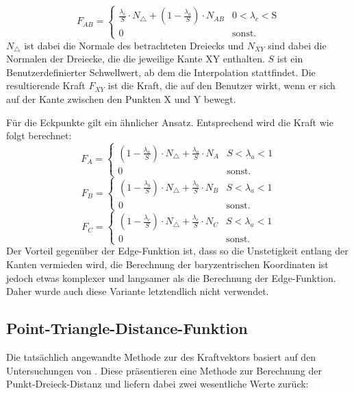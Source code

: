 \documentclass[conference]{IEEEtran}
\begin{document}
\begin{equation*}
    F_{AB} = 
    \begin{cases} 
        \frac{\lambda_c}{S}\cdot N_{\triangle} + (1-\frac{\lambda_a}{S})\cdot N_{AB} &  0 < \lambda_c < \text{S} \\
        0 & \text{sonst.}
    \end{cases}
\end{equation*}
$N_{\triangle}$ ist dabei die Normale des betrachteten Dreiecks und $N_{XY}$ sind dabei die Normalen der Dreiecke, die die jeweilige Kante XY enthalten. $S$ ist ein Benutzerdefinierter Schwellwert, ab dem die Interpolation stattfindet.
Die resultierende Kraft $F_{XY}$ ist die Kraft, die auf den Benutzer wirkt, wenn er sich auf der Kante zwischen den Punkten X und Y bewegt.

Für die Eckpunkte gilt ein ähnlicher Ansatz. Entsprechend wird die Kraft wie folgt berechnet:
\begin{equation*}
    F_{A} = 
    \begin{cases} 
        (1-\frac{\lambda_a}{S})\cdot N_{\triangle} + \frac{\lambda_a}{S}\cdot N_{A} &  S < \lambda_a < 1 \\
        0 & \text{sonst.}
    \end{cases}
\end{equation*} 
\begin{equation*}
    F_{B} = 
    \begin{cases} 
        (1-\frac{\lambda_b}{S})\cdot N_{\triangle} + \frac{\lambda_b}{S}\cdot N_{B} &  S < \lambda_a < 1 \\
        0 & \text{sonst.}
    \end{cases}
\end{equation*} 
\begin{equation*}
    F_{C} = 
    \begin{cases} 
        (1-\frac{\lambda_c}{S})\cdot N_{\triangle} + \frac{\lambda_c}{S}\cdot N_{C} &  S < \lambda_a < 1 \\
        0 & \text{sonst.}
    \end{cases}
\end{equation*} 
Der Vorteil gegenüber der Edge-Funktion ist, dass so die Unstetigkeit entlang der Kanten vermieden wird, 
die Berechnung der baryzentrischen Koordinaten ist jedoch etwas komplexer und langsamer als die 
Berechnung der Edge-Funktion. Daher wurde auch diese Variante letztendlich nicht verwendet.

\subsection{Point-Triangle-Distance-Funktion}
Die tatsächlich angewandte Methode zur des Kraftvektors basiert auf den Untersuchungen von . Diese  präsentieren eine Methode zur Berechnung der Punkt-Dreieck-Distanz und liefern dabei zwei wesentliche Werte zurück:
\end{document}
